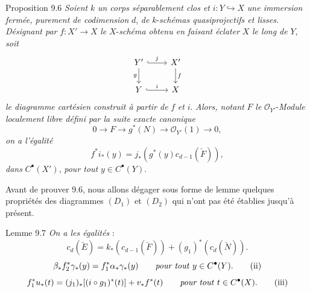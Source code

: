 \begin{statement}{Proposition 9.6}
\emph{Soient} $k$ \emph{un corps séparablement clos et} $i:Y\hookrightarrow X$ \emph{une immersion fermée, purement de codimension} $d$, \emph{de} $k$-\emph{schémas quasiprojectifs et lisses. Désignant par} $f:X'\to X$ \emph{le} $X$-\emph{schéma obtenu en faisant éclater} $X$ \emph{le long de} $Y$, \emph{soit}
\[
\begin{tikzcd}
Y'\arrow[r,hook,"j"]\arrow[d,"g"']&X'\arrow[d,"f"]\\
Y\arrow[r,hook,"i"]&X
\end{tikzcd}
\]
\emph{le diagramme cartésien construit à partir de} $f$ \emph{et} $i$. \emph{Alors, notant} $F$ \emph{le} $\mathcal{O}_{Y'}$-\emph{Module localement libre défini par la suite exacte canonique}
\[
0\to F\to g^*(N)\to\mathcal{O}_{Y'}(1)\to0,
\tag{9.6.1}
\]
\emph{on a l'égalité}
\[
f^*i_*(y)=j_*(g^*(y)c_{d-1}(\check F)),
\tag{9.6.2}
\]
\emph{dans} $C^{\bullet}(X')$, \emph{pour tout} $y\in C^{\bullet}(Y)$.
\end{statement}

Avant de prouver 9.6, nous allons dégager sous forme de lemme quelques propriétés des diagrammes $(D_1)$ et $(D_2)$ qui n'ont pas été établies jusqu'à présent.

\begin{statement}{Lemme 9.7}
\emph{On a les égalités} :
\[
c_d(\check E)=k_*(c_{d-1}(\check F))+(g_1)^*(c_d(\check N)).
\tag{i}
\]
\[
\beta_*f_2^*\gamma_*(y)=f_1^*\alpha_*\gamma_*(y)\qquad\text{\emph{pour tout} }y\in C^{\bullet}(Y).
\tag{ii}
\]
\[
f_1^*u_*(t)=(j_1)_*[(i\circ g_1)^*(t)]+v_*f^*(t)\qquad\text{\emph{pour tout} }t\in C^{\bullet}(X).
\tag{iii}
\]
\end{statement}

